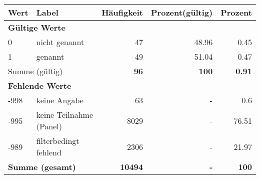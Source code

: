      \begin{longtable}{lXrrr}
     \toprule
     \textbf{Wert} & \textbf{Label} & \textbf{Häufigkeit} & \textbf{Prozent(gültig)} & \textbf{Prozent} \\
     \endhead
     \midrule
     \multicolumn{5}{l}{\textbf{Gültige Werte}}\\

     0 &
     \multicolumn{1}{X}{ nicht genannt   } &


       \num{47} &
       \num[round-mode=places,round-precision=2]{48.96} &
         \num[round-mode=places,round-precision=2]{0.45} \\

     1 &
     \multicolumn{1}{X}{ genannt   } &


       \num{49} &
       \num[round-mode=places,round-precision=2]{51.04} &
         \num[round-mode=places,round-precision=2]{0.47} \\
     \midrule
     \multicolumn{2}{l}{Summe (gültig)} &
       \textbf{\num{96}} &
     \textbf{\num{100}} &
       \textbf{\num[round-mode=places,round-precision=2]{0.91}} \\
     \multicolumn{5}{l}{\textbf{Fehlende Werte}}\\
       -998 &
       keine Angabe &
         \num{63} &
        - &
         \num[round-mode=places,round-precision=2]{0.6} \\
       -995 &
       keine Teilnahme (Panel) &
         \num{8029} &
        - &
         \num[round-mode=places,round-precision=2]{76.51} \\
       -989 &
       filterbedingt fehlend &
         \num{2306} &
        - &
         \num[round-mode=places,round-precision=2]{21.97} \\
     \midrule
     \multicolumn{2}{l}{\textbf{Summe (gesamt)}} &
          \textbf{\num{10494}} &
        \textbf{-} &
        \textbf{\num{100}} \\
     \bottomrule
     \end{longtable}
     

